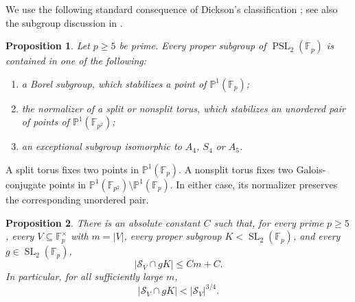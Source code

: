 \documentclass[11pt,reqno]{amsart}
\numberwithin{equation}{section}
\newtheorem{proposition}[proposition]{Proposition}
\theoremstyle{definition}
\theoremstyle{remark}
\newcommand{\F}{\mathbb F}
\newcommand{\Pone}{\mathbb P^1}
\newcommand{\SL}{\operatorname{SL}}
\newcommand{\PSL}{\operatorname{PSL}}
\newcommand{\cS}{\mathcal S}
\begin{document}
We use the following standard consequence of Dickson's classification \cite{Dickson1901}; see also the subgroup discussion in \cite{Helfgott2008}.

\begin{proposition}\label{prop:dickson}
Let $p\ge5$ be prime.  Every proper subgroup of $\PSL_2(\F_p)$ is contained in one of the following:
\begin{enumerate}[label=(\roman*)]
  \item a Borel subgroup, which stabilizes a point of $\Pone(\F_p)$;
  \item the normalizer of a split or nonsplit torus, which stabilizes an unordered pair of points of $\Pone(\F_{p^2})$;
  \item an exceptional subgroup isomorphic to $A_4$, $S_4$ or $A_5$.
\end{enumerate}
\end{proposition}

A split torus fixes two points in $\Pone(\F_p)$.  A nonsplit torus fixes two Galois-conjugate points in $\Pone(\F_{p^2})\setminus\Pone(\F_p)$.  In either case, its normalizer preserves the corresponding unordered pair.

\begin{proposition}\label{prop:subgroup-escape}
There is an absolute constant $C$ such that, for every prime $p\ge5$, every $V\subseteq\F_p^\times$ with $m=|V|$, every proper subgroup $K<\SL_2(\F_p)$, and every $g\in\SL_2(\F_p)$,
\begin{equation}\label{eq:subgroup-escape}
  |\cS_V\cap gK|\le Cm+C.
\end{equation}
In particular, for all sufficiently large $m$,
\begin{equation}\label{eq:subgroup-escape-power}
  |\cS_V\cap gK|<|\cS_V|^{3/4}.
\end{equation}
\end{proposition}
\end{document}
